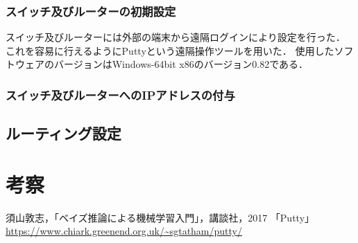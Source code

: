 \documentclass{jlreq}
\begin{document}
\subsubsection{スイッチ及びルーターの初期設定}
スイッチ及びルーターには外部の端末から遠隔ログインにより設定を行った．
これを容易に行えるようにPuttyという遠隔操作ツールを用いた．
使用したソフトウェアのバージョンはWindows-64bit x86のバージョン0.82である．

\subsubsection{スイッチ及びルーターへのIPアドレスの付与}


\subsection{ルーティング設定}

\section{考察}

\begin{thebibliography}{99}
     須山敦志，「ベイズ推論による機械学習入門」，講談社，2017
     「Putty」 \url{https://www.chiark.greenend.org.uk/~sgtatham/putty/}
\end{thebibliography}
\end{document}
